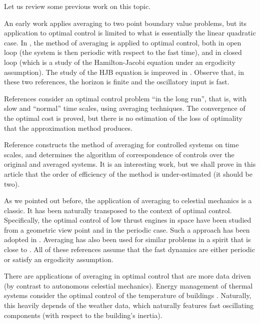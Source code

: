 \documentclass[a4paper,10pt]{article}
\begin{document}
Let us review some previous work on this topic.

An early work \cite{balachandra} applies averaging to two point 
boundary value problems, but its application to optimal control is 
limited to what is essentially the linear quadratic case.
In \cite{chaplais}, the method of averaging is applied to optimal 
control, both in open loop (the system is then periodic with respect 
to the fast time), and in closed loop 
(which is  a study of the Hamilton-Jacobi equation under an ergodicity 
assumption). The study of the HJB equation is improved in 
\cite{Barron1993}. Observe that, in these two references, the horizon 
is finite and the oscillatory input is fast. 

References 
\cite{GaitsgoryCDC2006,GaitsgorySIAM2006,GaitsgorySIAM2008,GaitsgoryCDC2009} 
consider an optimal control problem ``in the long run'', that is, 
with slow and ``normal'' time scales, using 
averaging techniques. The convergence of the optimal cost is proved, 
but there is no estimation of the loss of optimality that the 
approximation method produces. 

Reference \cite{Ogulenko} constructs the method of averaging for controlled systems on time scales, 
and determines the algorithm of correspondence of controls over the 
original and averaged systems. It is an interesting work, but we 
shall prove in this article that the order of efficiency of the method is 
under-estimated (it should be two).

As we pointed out before, the application of averaging to celestial 
mechanics is a classic. It has been naturally transposed to the 
context of optimal control. Specifically, the optimal control of low thrust engines 
in space have been studied from a geometric view point and in the 
periodic case.  Such a approach has been adopted in 
\cite{bonnard-BSM,Bonnard-Caillau2006,BonnardCaillauIHP}. Averaging  
has also been used for similar problems 
\cite{EpenoyGeoffroy1997,EpenoyEclipse} in a spirit that is close to
\cite{chaplais}. All of these references assume that the fast 
dynamics are either periodic or satisfy an ergodicity assumption.

There are applications of averaging in optimal control that are more 
data driven (by contrast to autonomous celestial mechanics). Energy 
management of thermal systems consider the optimal control of the 
temperature of buildings \cite{robillart}. Naturally, this heavily depends of the 
weather data, which naturally features fast oscillating components 
(with respect to the building's inertia).
\end{document}
